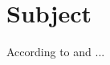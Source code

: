 \section{Subject}

According to \citet{2021RMxAA..57..433N} and \citet{2021RNAAS...5...51B} ...
\pyaneti \\
\citlalicue
